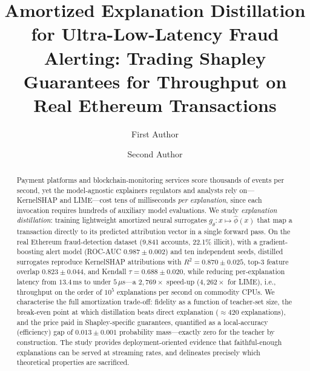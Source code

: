 \documentclass[runningheads]{llncs}
\begin{document}
\title{Amortized Explanation Distillation for Ultra-Low-Latency Fraud
Alerting: Trading Shapley Guarantees for Throughput on Real Ethereum
Transactions}


\author{First Author \and
Second Author}

\maketitle

\begin{abstract}
Payment platforms and blockchain-monitoring services score thousands of
events per second, yet the model-agnostic explainers regulators and
analysts rely on---KernelSHAP and LIME---cost tens of milliseconds
\emph{per explanation}, since each invocation requires hundreds of
auxiliary model evaluations. We study \emph{explanation distillation}:
training lightweight amortized neural surrogates
$g_\theta : x \mapsto \hat{\phi}(x)$ that map a transaction directly to its
predicted attribution vector in a single forward pass. On the real
Ethereum fraud-detection dataset (9{,}841 accounts, 22.1\% illicit), with a
gradient-boosting alert model (ROC-AUC $0.987 \pm 0.002$) and ten
independent seeds, distilled surrogates reproduce KernelSHAP attributions
with $R^2 = 0.870 \pm 0.025$, top-3 feature overlap $0.823 \pm 0.044$, and
Kendall $\tau = 0.688 \pm 0.020$, while reducing per-explanation latency
from $13.4$\,ms to under $5\,\mu$s---a $2{,}769\times$ speed-up
($4{,}262\times$ for LIME), i.e., throughput on the order of $10^5$
explanations per second on commodity CPUs. We characterise the full
amortization trade-off: fidelity as a function of teacher-set size, the
break-even point at which distillation beats direct explanation
($\approx 420$ explanations), and the price paid in Shapley-specific
guarantees, quantified as a local-accuracy (efficiency) gap of
$0.013 \pm 0.001$ probability mass---exactly zero for the teacher by
construction. The study provides deployment-oriented evidence that
faithful-enough explanations can be served at streaming rates, and
delineates precisely which theoretical properties are sacrificed.

\end{abstract}
\end{document}
